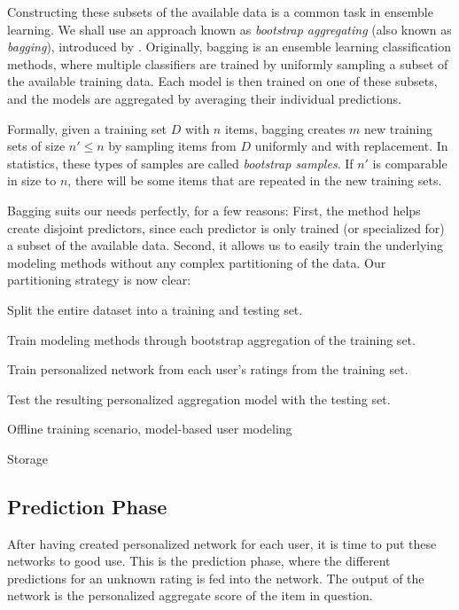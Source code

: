 Constructing these subsets of the available data is a common task in ensemble learning.
We shall use an approach known as  \emph{bootstrap aggregating} (also known as \emph{bagging}),
introduced by \cite{Breiman1996a}.
Originally, bagging is an ensemble learning classification methods, where multiple classifiers are 
trained by uniformly sampling a subset of the available training data. 
Each model is then trained on one of these subsets, and the models are aggregated by averaging their individual predictions.

Formally, given a training set $D$ with $n$ items, bagging creates $m$ new training sets of size $n' \leq n$ by sampling
items from $D$ uniformly and with replacement. 
In statistics, these types of samples are called \emph{bootstrap samples}.
If $n'$ is comparable in size to $n$, there will be some items
that are repeated in the new training sets.

Bagging suits our needs perfectly, for a few reasons: First, the method helps create disjoint predictors, 
since each predictor is only trained (or specialized for) a subset of the available data.
Second, it allows us to easily train the underlying modeling methods without any complex partitioning of the data.
Our partitioning strategy is now clear:

\begin{enumerate*}
  \item Split the entire dataset into a training and testing set.
  \item Train modeling methods through bootstrap aggregation of the training set.
  \item Train personalized network from each user's ratings from the training set.
  \item Test the resulting personalized aggregation model with the testing set.
\end{enumerate*}







Offline training scenario, model-based user modeling

Storage




\subsection{Prediction Phase}

After having created personalized network for each user, it is time to put these networks to good use.
This is the prediction phase, where the different predictions for an unknown rating is fed into the network.
The output of the network is the personalized aggregate score of the item in question.


